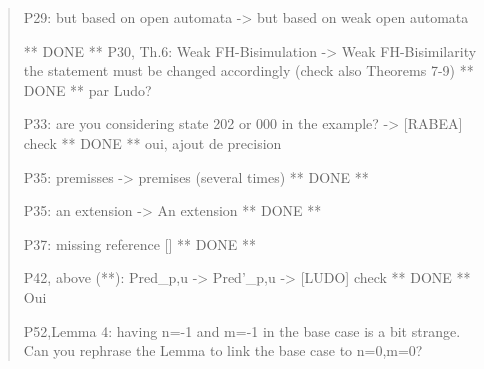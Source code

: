 \documentclass[10pt]{article}
\newenvironment{review}{\bgroup\itshape\begin{quote}}{\end{quote}\egroup}
\begin{document}
\begin{review}
P29: but based on open automata -> but based on weak open automata

** DONE ** 
P30, Th.6: Weak FH-Bisimulation -> Weak FH-Bisimilarity
the statement must be changed accordingly (check also Theorems 7-9)
** DONE ** par Ludo? 

P33: are you considering state 202 or 000 in the example?
-> [RABEA] check
** DONE ** oui, ajout de precision

P35: premisses -> premises (several times)
** DONE **

P35: an extension -> An extension
** DONE **

P37: missing reference []
** DONE ** 

P42, above (**): Pred_{p,u} -> Pred'_{p,u}
-> [LUDO] check
** DONE ** Oui

P52,Lemma 4: having n=-1 and m=-1 in the base case is a bit strange. Can you rephrase the Lemma to link the base case to n=0,m=0?
\end{review}
\end{document}
